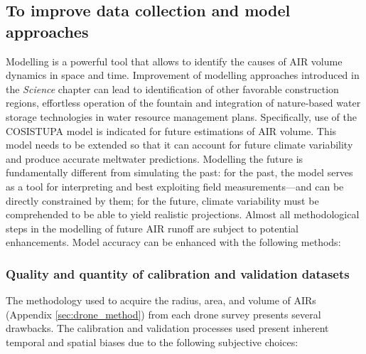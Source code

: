 \subsection{To improve data collection and model approaches}

Modelling is a powerful tool that allows to identify the causes of AIR volume dynamics in space and time.
Improvement of modelling approaches introduced in the \textit{Science} chapter can lead to identification of
other favorable construction regions, effortless operation of the fountain and integration of nature-based water
storage technologies in water resource management plans. Specifically, use of the COSISTUPA model is indicated
for future estimations of \ac{AIR} volume. This model needs to be extended so that it can account for future
climate variability and produce accurate meltwater predictions. Modelling the future is fundamentally different
from simulating the past: for the past, the model serves as a tool for interpreting and best exploiting field
measurements---and can be directly constrained by them; for the future, climate variability must be comprehended
to be able to yield realistic projections. Almost all methodological steps in the modelling of future \ac{AIR}
runoff are subject to potential enhancements. Model accuracy can be enhanced with the following methods:



\subsubsection{Quality and quantity of calibration and validation datasets}

The methodology used to acquire the radius, area, and volume of \ac{AIRs} (Appendix \ref{sec:drone_method}) from
each drone survey presents several drawbacks. The calibration and validation processes used present inherent temporal
and spatial biases due to the following subjective choices:


